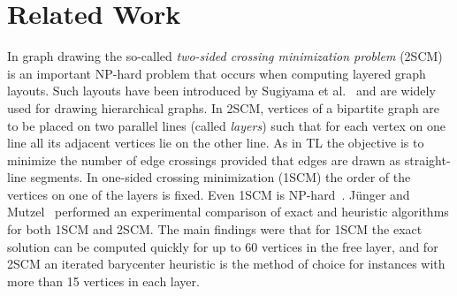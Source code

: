 \documentclass[runningheads,a4paper]{llncs}
\begin{document}
\section{Related Work}\label{sec:related}

In graph drawing the so-called \emph{two-sided crossing minimization
  problem} (2SCM) is an important NP-hard problem that occurs when
computing layered graph layouts.  Such layouts have been introduced by
Sugiyama et al.~\cite{stt-mvuhs-81} and are widely used for drawing
hierarchical graphs. In 2SCM, vertices of a bipartite graph are to be
placed on two parallel lines (called \emph{layers}) such that for each
vertex on one line all its adjacent vertices lie on the other line.
As in TL the objective is to minimize the number of edge crossings
provided that edges are drawn as straight-line segments.  In one-sided
crossing minimization (1SCM) the order of the vertices on one of the
layers is fixed.  Even 1SCM is NP-hard~\cite{ew-ecdbg-94}.
J\"unger and
Mutzel~\cite{jm-tlscm-97} performed an experimental comparison of
exact and heuristic algorithms for both 1SCM and 2SCM. The main
findings were that for 1SCM the exact solution can be computed quickly
for up to 60 vertices in the free layer, and for 2SCM an iterated
barycenter heuristic is the method of choice for instances with more
than 15 vertices in each layer.
\end{document}
